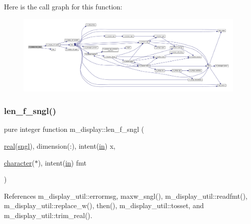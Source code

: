 Here is the call graph for this function\+:
\nopagebreak
\begin{figure}[H]
\begin{center}
\leavevmode
\includegraphics[width=350pt]{namespacem__display_a2a298a8f2faf00047152b93cd265d396_cgraph}
\end{center}
\end{figure}
\mbox{\label{namespacem__display_ae0feb946fbc4c31f8ba53e20719fa508}} 
\subsubsection{\texorpdfstring{len\+\_\+f\+\_\+sngl()}{len\_f\_sngl()}}
{\footnotesize\ttfamily pure integer function m\+\_\+display\+::len\+\_\+f\+\_\+sngl (\begin{DoxyParamCaption}\item[{\hyperlink{read__watch_83_8txt_abdb62bde002f38ef75f810d3a905a823}{real}(\hyperlink{namespacem__display_a2ac86bc535c3ccc5947dbb3109c666b5}{sngl}), dimension(\+:), intent(\hyperlink{M__journal_83_8txt_afce72651d1eed785a2132bee863b2f38}{in})}]{x,  }\item[{\hyperlink{option__stopwatch_83_8txt_abd4b21fbbd175834027b5224bfe97e66}{character}($\ast$), intent(\hyperlink{M__journal_83_8txt_afce72651d1eed785a2132bee863b2f38}{in})}]{fmt }\end{DoxyParamCaption})\hspace{0.3cm}{\ttfamily [private]}}



References m\+\_\+display\+\_\+util\+::errormsg, maxw\+\_\+sngl(), m\+\_\+display\+\_\+util\+::readfmt(), m\+\_\+display\+\_\+util\+::replace\+\_\+w(), then(), m\+\_\+display\+\_\+util\+::tosset, and m\+\_\+display\+\_\+util\+::trim\+\_\+real().

